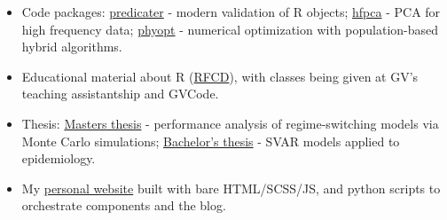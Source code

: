 \documentclass[11pt,oneside]{scrartcl}
\begin{document}
\begin{minipage}[t]{0.55\linewidth}
    \begin{itemize}
        \item Code packages: \href{https://ricardo-semiao.github.io/tools/predicater/}{predicater} - modern validation of R objects; \href{https://ricardo-semiao.github.io/tools/hfpca/}{hfpca} - PCA for high frequency data; \href{https://ricardo-semiao.github.io/tools/phyopt/}{phyopt} - numerical optimization with population-based hybrid algorithms.
        \item Educational material about R (\href{https://ricardo-semiao.github.io/library/rfcd/}{RFCD}), with classes being given at GV's teaching assistantship and GVCode.
        \item Thesis: \href{https://github.com/ricardo-semiao/article-regime-id-performance}{Masters thesis} - performance analysis of regime-switching models via Monte Carlo simulations; \href{https://github.com/ricardo-semiao/article-covid-svardiff}{Bachelor's thesis} - SVAR models applied to epidemiology.
        \item My \href{https://ricardo-semiao.github.io/}{personal website} built with bare HTML/SCSS/JS, and  python scripts to orchestrate components and the blog.
    \end{itemize}
\end{minipage}\hfill%
%
%
\end{document}
